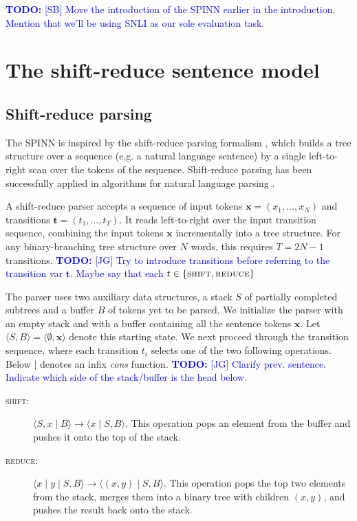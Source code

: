 \documentclass[11pt]{article}
\newcommand\todo[1]{\textcolor{blue}{\textbf{TODO:} #1}}
\newcommand{\shift}{\textsc{shift}}
\newcommand{\reduce}{\textsc{reduce}}
\begin{document}
\todo{[SB] Move the introduction of the SPINN earlier in the introduction. Mention that we'll be using SNLI as our sole evaluation task.}

\section{The shift-reduce sentence model}

\subsection{Shift-reduce parsing}

The SPINN is inspired by the shift-reduce parsing formalism \citep{aho1986compilers}, which builds a tree structure over a sequence (e.g. a natural language sentence) by a single left-to-right scan over the tokens of the sequence. Shift-reduce parsing has been successfully applied in algorithms for natural language parsing \citep{nivre2003efficient}.

A shift-reduce parser accepts a sequence of input tokens $\mathbf x = (x_1, \dots, x_N)$ and transitions $\mathbf t = (t_1, \dots, t_T)$. It reads left-to-right over the input transition sequence, combining the input tokens $\mathbf x$ incrementally into a tree structure. For any binary-branching tree structure over $N$ words, this requires $T = 2N - 1$ transitions. \todo{[JG] Try to introduce transitions before referring to the transition var $\mathbf t$. Maybe say that each $t\in\{\shift, \reduce\}$ }

The parser uses two auxiliary data structures, a stack $S$ of partially completed subtrees and a buffer $B$ of tokens yet to be parsed. We initialize the parser with an empty stack and with a buffer containing all the sentence tokens $\mathbf x$. Let $\langle S, B \rangle = \langle \emptyset, \mathbf x \rangle$ denote this starting state. We next proceed through the transition sequence, where each transition $t_i$ selects one of the two following operations. Below $\mid$ denotes an infix \textit{cons} function. \todo{[JG] Clarify prev. sentence. Indicate which side of the stack/buffer is the head below.}
\begin{description}
  \item[\shift:] $\langle S, x \mid B \rangle \to \langle x \mid S, B \rangle$. This operation pops an element from the buffer and pushes it onto the top of the stack.
  \item[\reduce:] $\langle x \mid y \mid S, B \rangle \to \langle (x, y) \mid S, B \rangle$. This operation pops the top two elements from the stack, merges them into a binary tree with children $(x, y)$, and pushes the result back onto the stack.
\end{description}
\end{document}
